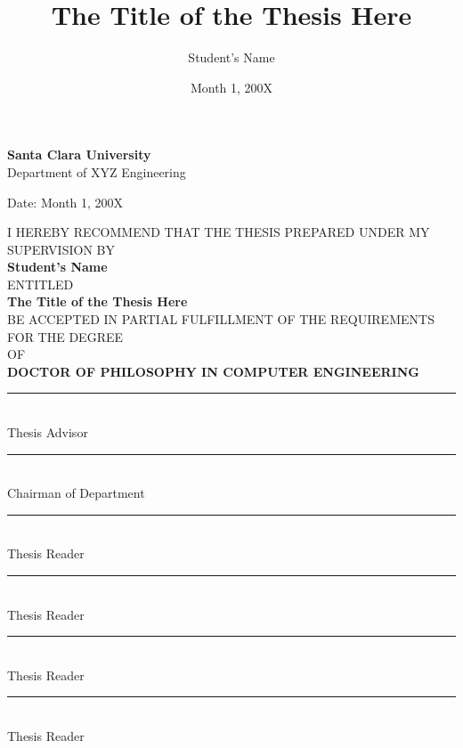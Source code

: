 \documentclass[12pt]{report}
\title{The Title of the Thesis Here}
\author{Student's Name}
\date{Month 1, 200X}
\newcommand{\sixteenpt}{\fontsize{16pt}{19.2pt}\selectfont}
\newcommand{\tenpt}{\fontsize{10pt}{12pt}\selectfont}
\newcommand{\elevenpt}{\fontsize{11pt}{13pt}\selectfont}
\begin{document}
\thispagestyle{empty}

\vspace*{0.8cm} 


{\centering
    {\sixteenpt\textbf{Santa Clara University}}\\[0.5cm]
    {\normalsize Department of XYZ Engineering}\\
}


\begin{flushright}
    Date: Month 1, 200X
\end{flushright}

{\centering
    {\tenpt I HEREBY RECOMMEND THAT THE THESIS PREPARED UNDER MY SUPERVISION BY}\\[1cm]
    
    {\textbf{Student's Name}}\\[0.25cm]
    
    {\elevenpt ENTITLED}\\[1cm]
    
    {\sixteenpt \textbf{The Title of the Thesis Here}}\\[1cm]
    
    {\tenpt BE ACCEPTED IN PARTIAL FULFILLMENT OF THE REQUIREMENTS FOR THE DEGREE}\\[0.5cm]
    
    {\tenpt OF}\\[0.5cm]
    
    {\textbf{DOCTOR OF PHILOSOPHY IN COMPUTER ENGINEERING}}\\[2cm]
}

\begin{center}
    \begin{minipage}[t]{0.45\textwidth}
        \rule{2.5in}{0.4pt}\\[-0.1cm]
        Thesis Advisor\\[1cm]  
        \rule{2.5in}{0.4pt}\\[-0.1cm]
        Chairman of Department
    \end{minipage}
    \hfill
    \begin{minipage}[t]{0.45\textwidth}
        \rule{2.5in}{0.4pt}\\[-0.1cm]
        Thesis Reader\\[1cm]
        \rule{2.5in}{0.4pt}\\[-0.1cm]
        Thesis Reader\\[1cm]
        \rule{2.5in}{0.4pt}\\[-0.1cm]
        Thesis Reader\\[1cm]
        \rule{2.5in}{0.4pt}\\[-0.1cm]
        Thesis Reader
    \end{minipage}
\end{center}
\end{document}
